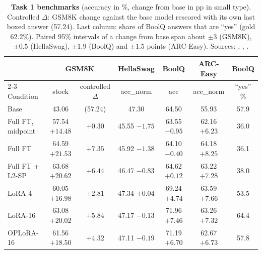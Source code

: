 \begin{table}[t]
  \centering
  \small
  \setlength{\tabcolsep}{4.2pt}
  \begin{tabular}{lcccccc}
    \toprule
    & \multicolumn{2}{c}{GSM8K} & HellaSwag & BoolQ & ARC-Easy & BoolQ \\
    \cmidrule(lr){2-3}
    Condition & stock & controlled $\Delta$ & acc\_norm & acc & acc\_norm & ``yes'' \% \\
    \midrule
    Base & 43.06 & (57.24) & 47.30 & 64.50 & 55.93 & 57.9 \\
    Full FT, midpoint & 57.54 \scriptsize{$+14.48$} & $+0.30$ & 45.55 \scriptsize{$-1.75$} & 63.55 \scriptsize{$-0.95$} & 62.16 \scriptsize{$+6.23$} & 36.0 \\
    Full FT & 64.59 \scriptsize{$+21.53$} & $+7.35$ & 45.92 \scriptsize{$-1.38$} & 64.10 \scriptsize{$-0.40$} & 64.18 \scriptsize{$+8.25$} & 36.1 \\
    Full FT + L2-SP & 63.68 \scriptsize{$+20.62$} & $+6.44$ & 46.47 \scriptsize{$-0.83$} & 64.62 \scriptsize{$+0.12$} & 63.22 \scriptsize{$+7.28$} & 38.0 \\
    LoRA-4 & 60.05 \scriptsize{$+16.98$} & $+2.81$ & 47.34 \scriptsize{$+0.04$} & 69.24 \scriptsize{$+4.74$} & 63.59 \scriptsize{$+7.66$} & 53.5 \\
    LoRA-16 & 63.08 \scriptsize{$+20.02$} & $+5.84$ & 47.17 \scriptsize{$-0.13$} & 71.96 \scriptsize{$+7.46$} & 63.26 \scriptsize{$+7.32$} & 64.4 \\
    OPLoRA-16 & 61.56 \scriptsize{$+18.50$} & $+4.32$ & 47.11 \scriptsize{$-0.19$} & 71.19 \scriptsize{$+6.70$} & 62.67 \scriptsize{$+6.73$} & 57.8 \\
    \bottomrule
  \end{tabular}
  \caption{\textbf{Task 1 benchmarks} (accuracy in \%, change from base in pp in small type). Controlled $\Delta$: GSM8K change against the base model rescored with its own last boxed answer (57.24). Last column: share of BoolQ answers that are ``yes'' (gold 62.2\%). Paired 95\% intervals of a change from base span about $\pm3$ (GSM8K), $\pm0.5$ (HellaSwag), $\pm1.9$ (BoolQ) and $\pm1.5$ points (ARC-Easy). Sources: , , .}
  \label{tab:task1}
\end{table}

